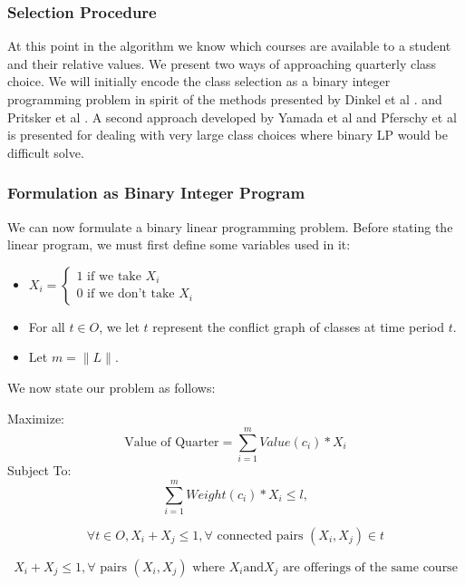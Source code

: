 \documentclass[11pt]{article} %
\begin{document}
\subsubsection{Selection Procedure} At this point in the algorithm we know which
courses are available to a student and their relative values. We present two
ways of approaching quarterly class choice.  We will initially encode the class
selection as a binary integer programming problem in spirit of the methods
presented by Dinkel et al \cite{dinkel:scheduling}. and Pritsker et al
\cite{prisker:informs}. A second approach developed by Yamada et al
\cite{yamada:heuristic} and Pferschy et al \cite{pferschy:kcg} is presented for
dealing with very large class choices where binary LP would be difficult solve.

\subsubsection{Formulation as Binary Integer Program} We can now formulate
a binary linear programming problem. Before stating the linear
program, we must first define some variables used in it: 

\begin{itemize}
    \item $ X_i = \left\{ \begin{array}{lr} 1 \text{ if we take } X_i\\ 0 \text{ if
we don't take } X_i \end{array} \right. $ 
    \item For all $t \in O$, we let $t$ represent the conflict graph of classes
    at time period $t$.
    \item Let $m = \|L\|$.  
\end{itemize} 
We now state our problem as follows: 

Maximize: 
\begin{equation}
    \text{Value of Quarter} = \sum_{i=1}^m Value(c_i) * X_i
    \label{qtr_val}
\end{equation}
Subject To:
\begin{equation}
    \sum_{i=1}^m Weight(c_i) * X_i \leq l, 
    \label{weight_lim}
\end{equation}

\begin{equation}
    \forall t \in O,X_i+X_j \leq 1, \forall \text{ connected pairs } (X_i,X_j) \in t
    \label{time_con}
\end{equation}

\begin{equation}
   X_i + X_j \leq 1, \forall \text{ pairs } (X_i,X_j) \text{ where } X_i \text{and} X_j \text{ are offerings of
   the same course}
    \label{course_con}
\end{equation}
\end{document}
